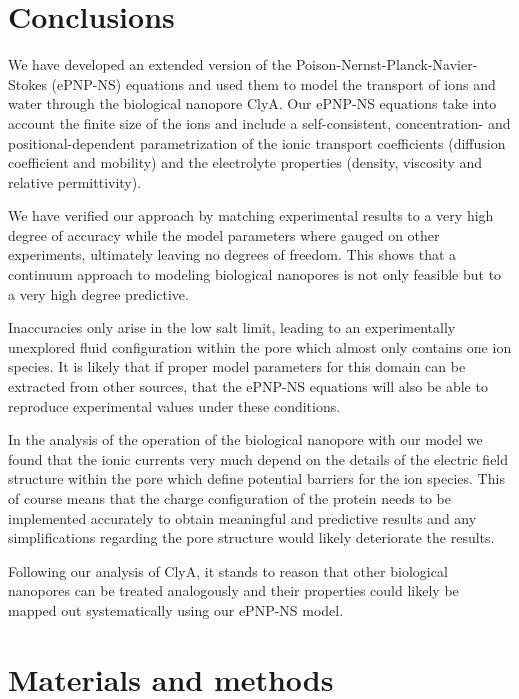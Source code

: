 \documentclass[journal=ancac3,manuscript=article,etalmode=truncate,maxauthors=0,layout=twocolumn]{achemso}
\begin{document}
\section{Conclusions}\label{sect:conclusions}
We have developed an extended version of the Poison-Nernst-Planck-Navier-Stokes (ePNP-NS) equations and used
them to model the transport of ions and water through the biological nanopore ClyA. Our ePNP-NS equations take
into account the finite size of the ions and include a self-consistent, concentration- and
positional-dependent parametrization of the ionic transport coefficients (diffusion coefficient and mobility)
and the electrolyte properties (density, viscosity and relative permittivity).

We have verified our approach by matching experimental results to a very high degree of accuracy while
the model parameters where gauged on other experiments, ultimately leaving no degrees of freedom. This shows
that a continuum approach to modeling biological nanopores is not only feasible but to a very high degree
predictive.

Inaccuracies only arise in the low salt limit, leading to an experimentally unexplored fluid configuration
within the pore which almost only contains one ion species. It is likely that if proper model parameters for
this domain can be extracted from other sources, that the ePNP-NS equations will also be able to reproduce
experimental values under these conditions.

In the analysis of the operation of the biological nanopore with our model we found that the ionic currents
very much depend on the details of the electric field structure within the pore which define potential
barriers for the ion species. This of course means that the charge configuration of the protein needs to be
implemented accurately to obtain meaningful and predictive results and any simplifications regarding the pore
structure would likely deteriorate the results.

Following our analysis of ClyA, it stands to reason that other biological nanopores can be treated
analogously and their properties could likely be mapped out systematically using our ePNP-NS model.


\section{Materials and methods}
\end{document}
